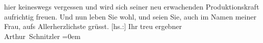 \begin{ledgroupsized}[t]{13cm}
               hier keineswegs vergessen\strikeout{,} und wird sich seiner neu
               erwachenden Produktionskraft aufrichtig freuen.\pend
           \pstart
           Und nun leben Sie wohl, und seien Sie, auch im Namen meiner Frau, aufs Allerherzlichste grüsst.\pend
           \pstart
           {[}hs.:{]} Ihr treu ergebner{\\[\baselineskip]}\spacefill\mbox{Arthur Schnitzler}\pend
           \leftskip=0em{}\endnumbering{}\end{ledgroupsized}  \newcommand{\dateiname}{L02222}\newcommand{\titel}{Arthur Schnitzler an Georg Brandes, 9. 12. 1915}\newcommand{\editorInnen}{ Martin Anton Müller und Gerd-Hermann Susen}
            \footnotesize
\begin{ledgroupsized}[t]{11.5cm}
\end{ledgroupsized}
         
      